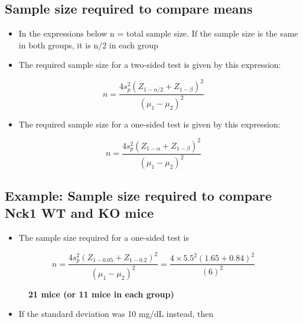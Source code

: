 \documentclass[
]{book}
\providecommand{\tightlist}{%
  \setlength{\itemsep}{0pt}\setlength{\parskip}{0pt}}
\begin{document}
\hypertarget{sample-size-required-to-compare-means}{%
\subsection{Sample size required to compare means}\label{sample-size-required-to-compare-means}}

\begin{itemize}
\tightlist
\item
  In the expressions below n = total sample size. If the sample size is the same in both groups, it is n/2 in each group
\item
  The required sample size for a two-sided test is given by this expression:
\end{itemize}

\[n = \frac{4s_p^2(Z_{1-\alpha/2}+Z_{1-\beta})^2}{(\mu_1-\mu_2)^2}\]

\begin{itemize}
\tightlist
\item
  The required sample size for a one-sided test is given by this expression:
\end{itemize}

\[n = \frac{4s_p^2(Z_{1-\alpha}+Z_{1-\beta})^2}{(\mu_1-\mu_2)^2}\]

\hypertarget{example-sample-size-required-to-compare-nck1-wt-and-ko-mice}{%
\subsection{Example: Sample size required to compare Nck1 WT and KO mice}\label{example-sample-size-required-to-compare-nck1-wt-and-ko-mice}}

\begin{itemize}
\tightlist
\item
  The sample size required for a one-sided test is
\end{itemize}

\begin{description}
\item[\[n = \frac{4s_p^2(Z_{1-0.05}+Z_{1-0.2})^2}{(\mu_1-\mu_2)^2}=\frac{4\times 5.5^2(1.65+0.84)^2}{(6)^2}\]]
\textbf{21 mice (or 11 mice in each group)}
\end{description}

\begin{itemize}
\tightlist
\item
  If the standard deviation was 10 mg/dL instead, then
\end{itemize}
\end{document}
